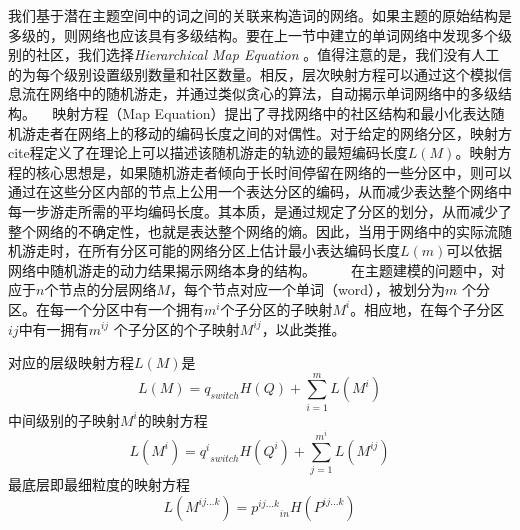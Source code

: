我们基于潜在主题空间中的词之间的关联来构造词的网络。如果主题的原始结构是多级的，则网络也应该具有多级结构。要在上一节中建立的单词网络中发现多个级别的社区，我们选择\emph{Hierarchical Map Equation} \cite{HME}。值得注意的是，我们没有人工的为每个级别设置级别数量和社区数量。相反，层次映射方程\cite{HME}可以通过这个模拟信息流在网络中的随机游走，并通过类似贪心的算法，自动揭示单词网络中的多级结构。
 
映射方程（Map Equation）提出了寻找网络中的社区结构和最小化表达随机游走者在网络上的移动的编码长度之间的对偶性。对于给定的网络分区，映射方cite程定义了在理论上可以描述该随机游走的轨迹的最短编码长度$ L(M)$。映射方程的核心思想是，如果随机游走者倾向于长时间停留在网络的一些分区中，则可以通过在这些分区内部的节点上公用一个表达分区的编码，从而减少表达整个网络中每一步游走所需的平均编码长度。其本质，是通过规定了分区的划分，从而减少了整个网络的不确定性，也就是表达整个网络的熵。因此，当用于网络中的实际流随机游走时，在所有分区可能的网络分区上估计最小表达编码长度$L(m)$可以依据网络中随机游走的动力结果揭示网络本身的结构。
 
  
在主题建模的问题中，对应于$n$个节点的分层网络$ M $，每个节点对应一个单词（word），被划分为$ m $ 个分区。在每一个分区中有一个拥有$ m^i $个子分区的子映射$ M ^ i $。相应地，在每个子分区$ij $中有一拥有$ m ^ {ij} $ 个子分区的个子映射$ M ^ {ij} $，以此类推。

对应的层级映射方程$L(M)$是
 \begin{equation}
  L(M) = q_{switch}H(Q) + \sum_{i=1}^mL(M^i)
  \end{equation}
 中间级别的子映射$M^i$的映射方程
   \begin{equation}
  L(M^i) = {q^i}_{switch}H(Q^i) + \sum_{j=1}^{m^i} L(M^{ij})
  \end{equation}
  最底层即最细粒度的映射方程
  \begin{equation}
  L(M^{ij...k}) = {p^{ij...k}}_{in} H(P^{ij...k})
  \end{equation}

